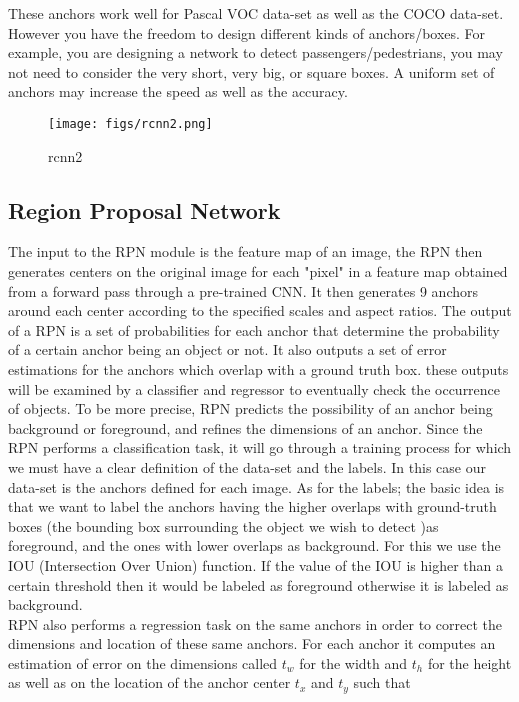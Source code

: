 These anchors work well for Pascal VOC data-set as well as the COCO data-set. However you have the freedom to design different kinds of anchors/boxes. For example, you are designing a network to detect passengers/pedestrians, you may not need to consider the very short, very big, or square boxes. A uniform set of anchors may increase the speed as well as the accuracy.

\begin{figure}[!htpb]
	\centering
	\texttt{[image: figs/rcnn2.png]}
	\caption{rcnn2}\label{fig:rcnn2}
\end{figure}

\subsection{Region Proposal Network}
The input to the RPN module is the feature map of an image, the RPN then generates centers on the original image for each "pixel" in a feature map obtained from a forward pass through a pre-trained CNN. It then generates 9 anchors around each center according to the specified scales and aspect ratios.
The output of a RPN is a set of probabilities  for each anchor that determine the probability of a certain anchor being an object or not. It also outputs a set of error estimations for the anchors which overlap with a ground truth box. these outputs will be examined by a classifier and regressor to eventually check the occurrence of objects. To be more precise, RPN predicts the possibility of an anchor being background or foreground, and refines the dimensions of an anchor.
Since the RPN performs a classification task, it will go through a training process for which we must have a clear definition of the data-set and the labels. In this case our data-set is the anchors defined for each image. As for the labels; the basic idea  is that we want to label the anchors having the higher overlaps with ground-truth boxes (the bounding box surrounding the object we wish to detect )as foreground, and the ones with lower overlaps as background. For this we use the IOU (Intersection Over Union) function. If the value of the IOU is higher than a certain threshold then it would be labeled as foreground otherwise it is labeled as background. \\

RPN also performs a regression task on the same anchors in order to correct the dimensions and location of these same anchors. For each anchor it computes an estimation of error on the dimensions called $t_{w}$ for the width and $t_{h}$ for the height as well as on the location of the anchor center $t_{x}$ and $t_{y}$ such that

